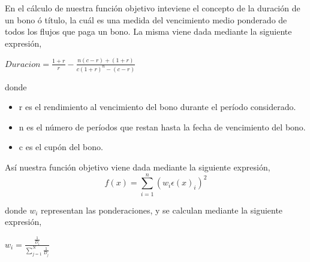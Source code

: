 \hspace{0.4cm} En el c\'alculo de nuestra funci\'on objetivo inteviene el concepto de la duraci\'on de un bono \'o t\'itulo, la cu\'al es una medida del vencimiento medio ponderado de todos los flujos que paga un bono. La misma viene dada mediante la siguiente expresi\'on, \\

\begin{center}

$\displaystyle{Duracion = \frac{1+r}{r} - \frac{n(c-r)+(1+r)}{c(1+r)^{n}-(c-r)}}$

\end{center}

\vspace{0.5cm}

\newpage

\noindent donde

\begin{itemize}
  \item r es el rendimiento al vencimiento del bono durante el per\'iodo considerado.
  \item n es el n\'umero de per\'iodos que restan hasta la fecha de vencimiento del bono.
  \item c es el cup\'on del bono.
\end{itemize}


\vspace{0.5cm}

\hspace{0.4cm} As\'i nuestra funci\'on objetivo viene dada mediante la siguiente expresi\'on,\\

\begin{equation}\label{ecua2}
  f(x) = \sum_{i=1}^{n} (w_{i}\epsilon(x)_{i} )^2
\end{equation}



\vspace{0.5cm}
\noindent donde $w_{i}$ representan las ponderaciones, y se calculan mediante la siguiente expresi\'on,\\

\begin{center}

$\displaystyle{w_{i} = \frac{\frac{1}{D_{i}}}{\sum_{j=1}^{N}\frac{1}{D_{j}}}}$

\end{center}

\vspace{0.5cm}

